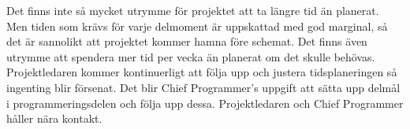 Det finns inte så mycket utrymme för projektet att ta längre tid än planerat. Men tiden som krävs för varje delmoment är uppskattad med god marginal, så det är sannolikt att projektet kommer hamna före schemat. Det finns även utrymme att spendera mer tid per vecka än planerat om det skulle behövas. Projektledaren kommer kontinuerligt att följa upp och justera tidsplaneringen så ingenting blir försenat. Det blir Chief Programmer’s uppgift att sätta upp delmål i programmeringsdelen och följa upp dessa. Projektledaren och Chief Programmer håller nära kontakt.
